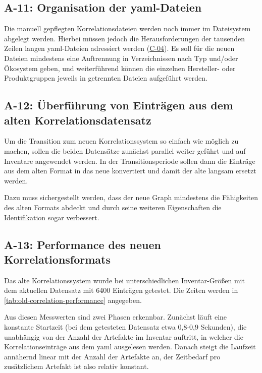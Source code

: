 \subsection{A-11: Organisation der \acrshort{yaml}-Dateien}\label{subsec:req-yaml-file-organization}

Die manuell gepflegten Korrelationsdateien werden noch immer im Dateisystem abgelegt werden.
Hierbei müssen jedoch die Herausforderungen der tausenden Zeilen langen \acrshort{yaml}-Dateien adressiert werden (\hyperref[subsec:c-04-groe-und-unubersichtliche-yaml-dateien]{C-04}).
Es soll für die neuen Dateien mindestens eine Auftrennung in Verzeichnissen nach Typ und/oder Ökosystem geben, und weiterführend können die einzelnen Hersteller- oder Produktgruppen jeweils in getrennten Dateien aufgeführt werden.

\subsection{A-12: Überführung von Einträgen aus dem alten Korrelationsdatensatz}\label{subsec:req-current-dataset-conversion}

Um die Transition zum neuen Korrelationssystem so einfach wie möglich zu machen, sollen die beiden Datensätze zunächst parallel weiter geführt und auf Inventare angewendet werden.
In der Transitionsperiode sollen dann die Einträge aus dem alten Format in das neue konvertiert und damit der alte langsam ersetzt werden.

Dazu muss sichergestellt werden, dass der neue Graph mindestens die Fähigkeiten des alten Formats abdeckt und durch seine weiteren Eigenschaften die Identifikation sogar verbessert.

\subsection{A-13: Performance des neuen Korrelationsformats}\label{subsec:req-correlation-format-performance}

Das alte Korrelationssystem wurde bei unterschiedlichen Inventar-Größen mit dem aktuellen Datensatz mit 6400 Einträgen getestet.
Die Zeiten werden in \autoref{tab:old-correlation-performance} angegeben.

Aus diesen Messwerten sind zwei Phasen erkennbar.
Zunächst läuft eine konstante Startzeit (bei dem getesteten Datensatz etwa 0,8-0,9 Sekunden), die unabhängig von der Anzahl der Artefakte im Inventar auftritt, in welcher die Korrelationseinträge aus dem \acrshort{yaml} ausgelesen werden.
Danach steigt die Laufzeit annähernd linear mit der Anzahl der Artefakte an, der Zeitbedarf pro zusätzlichem Artefakt ist also relativ konstant.

